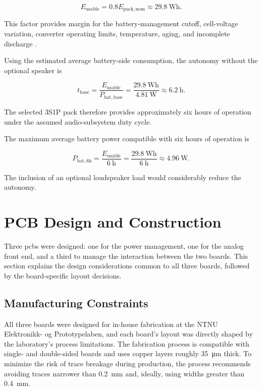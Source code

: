 \begin{equation}
E_{\mathrm{usable}}
=
0.8E_{\mathrm{pack,nom}}
\approx 29.8~\mathrm{Wh}.
\label{eq:pack_usable_energy}
\end{equation}

This factor provides margin for the battery-management cutoff, cell-voltage variation, converter operating limits, temperature, aging, and incomplete discharge \cite{BatteryUniversitySeriesParallel}.

Using the estimated average battery-side consumption, the autonomy without the optional speaker is

\begin{equation}
t_{\mathrm{base}}
=
\frac{E_{\mathrm{usable}}}
{P_{\mathrm{bat,base}}}
=
\frac{29.8~\mathrm{Wh}}
{4.81~\mathrm{W}}
\approx 6.2~\mathrm{h}.
\end{equation}

The selected 3S1P pack therefore provides approximately six hours of operation under the assumed audio-subsystem duty cycle.

The maximum average battery power compatible with six hours of operation is

\begin{equation}
P_{\mathrm{bat,6h}}
=
\frac{E_{\mathrm{usable}}}
{6~\mathrm{h}}
=
\frac{29.8~\mathrm{Wh}}
{6~\mathrm{h}}
\approx 4.96~\mathrm{W}.
\end{equation}

The inclusion of an optional loudspeaker load would considerably reduce the autonomy.

\section{PCB Design and Construction}
\label{sec:pcb}
Three \acrshort{pcb}s were designed: one for the power management, one for the analog front end, and a third to manage the interaction between the two boards. This section explains the design considerations common to all three boards, followed by the board-specific layout decisions.

\subsection{Manufacturing Constraints}
\label{sec:pcb_manufacturing}

All three boards were designed for in-house fabrication at the NTNU Elektronikk- og Prototypelaben, and each board’s layout was directly shaped by the laboratory’s process limitations. The fabrication process is compatible with single- and double-sided boards and uses copper layers roughly \SI{35}{\micro\meter} thick. To minimize the risk of trace breakage during production, the process recommends avoiding traces narrower than \SI{0.2}{\milli\meter} and, ideally, using widths greater than \SI{0.4}{\milli\meter}.

